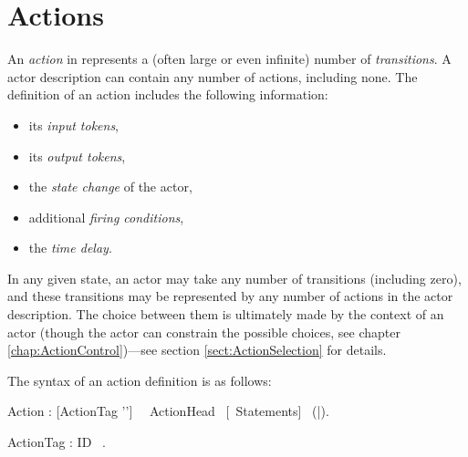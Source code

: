 
\chapter{Actions}\label{chap:Actions}



 
 

An {\em action} in
\Cal represents a (often large or even infinite) number of {\em
  transitions}. A \Cal actor description can contain any number of
actions, including none. The definition of an action includes the
following information:
\begin{itemize}
\item its {\em input tokens},
\item its {\em output tokens},
\item the {\em state change} of the actor,
\item additional {\em firing conditions},
\item the {\em time delay}.
\end{itemize}

In any given state, an actor may take any number of transitions
(including zero), and these
transitions may be represented by any number of actions in the actor
description. The choice between them is ultimately made by the context
of an actor (though the actor can constrain the possible choices, see
chapter \ref{chap:ActionControl})---see section
\ref{sect:ActionSelection} for details.

The syntax of an action definition is as follows:



\bgr
Action : [ActionTag '\charColon']~\kwAction~ ActionHead ~[\kwDo ~Statements]~ (\kwEnd|\kwEndAction).

ActionTag : ID ~.

